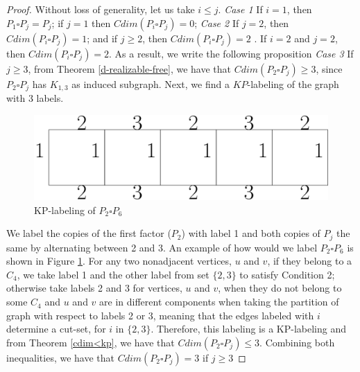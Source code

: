 \documentclass[12pt,a4paper,titlepage,openany]{report}
\begin{document}
\begin{proof}
 Without loss of generality, let us take $i\leq j$.\newline
\textit{Case 1} If $i=1$, then $P_1\square P_j=P_j$; if $j=1$ then $Cdim(P_i\square P_j)=0$;
\textit{Case 2} If $j=2$, then $Cdim(P_i\square P_j)=1$; and if $j\geq 2$, then $Cdim(P_i\square P_j)=2$
 .\newline 
If $i=2$ and $j=2$, then $Cdim(P_i\square P_j)=2$.
As a result, we write the following proposition
\newline
\textit{Case 3} If $j\geq 3$, from Theorem \ref{d-realizable-free}, we have that $Cdim(P_2\square P_j)\geq 3$, since $P_2 \square P_j$ has $K_{1,3}$ as induced subgraph.\newline
Next, we find a $KP$-labeling of the graph with 3 labels.
\begin{figure}[h]
\begin{center}
\includegraphics[width=1\linewidth]{figures/p_2sqp_j.png}
\end{center}
\caption{KP-labeling of $P_2\square P_6$}\label{fig:P_2sqP_6}
\end{figure}\newline
We label the copies of the first factor ($P_2$) with label 1 and both copies of $P_j$ the same by alternating between 2 and 3.
An example of how would we label $P_2\square P_6$ is shown in Figure \ref{fig:P_2sqP_6}.\newline
For any two nonadjacent vertices, $u$ and $v$, if they belong to a $C_4$, we take label 1 and the other label from set $\{2,3\}$ to satisfy Condition 2; otherwise take labels 2 and 3 for vertices, $u$ and $v$, when they do not belong to some $C_4$ and $u$ and $v$ are in different components when taking the partition of graph with respect to labels 2 or 3, meaning that the edges labeled with $i$ determine a cut-set, for $i$ in $\{2,3\}$.\newline
Therefore, this labeling is a KP-labeling and from Theorem \ref{cdim<kp}, we have that $Cdim(P_2\square P_j)\leq 3$.\newline
Combining both inequalities, we have that $Cdim(P_2\square P_j)=3$ if $j\geq 3$




\end{proof}
\end{document}
